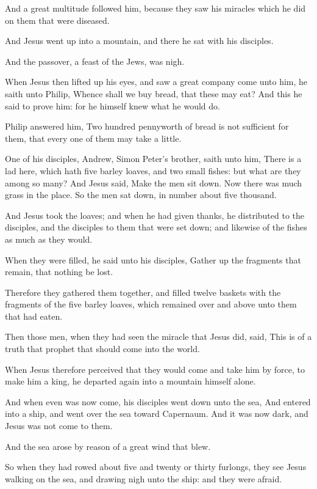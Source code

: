 \verse And a great multitude followed him, because they saw his miracles which he did on them that were diseased.

\verse And Jesus went up into a mountain, and there he sat with his disciples.

\verse And the passover, a feast of the Jews, was nigh.

\verse When Jesus then lifted up his eyes, and saw a great company come unto him, he saith unto Philip, Whence shall we buy bread, that these may eat?  \verse And this he said to prove him: for he himself knew what he would do.

\verse Philip answered him, Two hundred pennyworth of bread is not sufficient for them, that every one of them may take a little.

\verse One of his disciples, Andrew, Simon Peter's brother, saith unto him, \verse There is a lad here, which hath five barley loaves, and two small fishes: but what are they among so many?  \verse And Jesus said, Make the men sit down. Now there was much grass in the place. So the men sat down, in number about five thousand.

\verse And Jesus took the loaves; and when he had given thanks, he distributed to the disciples, and the disciples to them that were set down; and likewise of the fishes as much as they would.

\verse When they were filled, he said unto his disciples, Gather up the fragments that remain, that nothing be lost.

\verse Therefore they gathered them together, and filled twelve baskets with the fragments of the five barley loaves, which remained over and above unto them that had eaten.

\verse Then those men, when they had seen the miracle that Jesus did, said, This is of a truth that prophet that should come into the world.

\verse When Jesus therefore perceived that they would come and take him by force, to make him a king, he departed again into a mountain himself alone.

\verse And when even was now come, his disciples went down unto the sea, \verse And entered into a ship, and went over the sea toward Capernaum.  And it was now dark, and Jesus was not come to them.

\verse And the sea arose by reason of a great wind that blew.

\verse So when they had rowed about five and twenty or thirty furlongs, they see Jesus walking on the sea, and drawing nigh unto the ship: and they were afraid.

